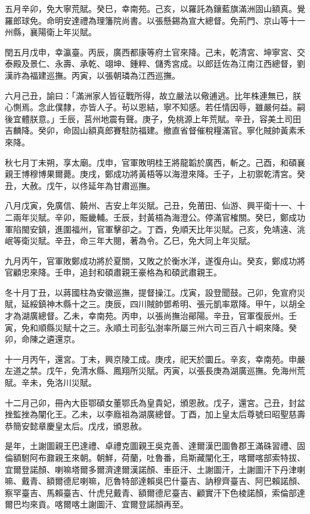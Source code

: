 \begin{pinyinscope}
五月辛卯，免大寧荒賦。癸巳，幸南苑。己亥，以羅託為鑲藍旗滿洲固山額真。覺羅郎球免。命明安達禮為理籓院尚書。以張懸錫為宣大總督。免荊門、京山等十一州縣，襄陽衛上年災賦。

閏五月戊申，幸瀛臺。丙辰，廣西都康等府土官來降。己未，乾清宮、坤寧宮、交泰殿及景仁、永壽、承乾、翊坤、鍾粹、儲秀宮成。以郎廷佐為江南江西總督，劉漢祚為福建巡撫。丙寅，以張朝璘為江西巡撫。

六月己丑，諭曰：「滿洲家人皆征戰所得，故立嚴法以儆逋逃。比年株連無已，朕心惻焉。念此僕隸，亦皆人子。茍以恩結，寧不知感。若任情因辱，雖嚴何益。嗣後宜體朕意。」壬辰，莒州地震有聲。庚子，免桃源上年荒賦。辛丑，容美土司田吉麟降。癸卯，命固山額真郎賽駐防福建。撤直省督催稅糧滿官。寧化賊帥黃素禾來降。

秋七月丁未朔，享太廟。戊申，官軍敗明桂王將龍韜於廣西，斬之。己酉，和碩襄親王博穆博果爾薨。庚戌，鄭成功將黃梧等以海澄來降。壬子，上初禦乾清宮。癸丑，大赦。戊午，以佟延年為甘肅巡撫。

八月戊寅，免廣信、饒州、吉安上年災賦。己丑，免莆田、仙游、興平衛十一、十二兩年災賦。辛卯，賑畿輔。壬辰，封黃梧為海澄公。停滿官榷關。癸巳，鄭成功軍陷閩安鎮，進圍福州，官軍擊卻之。丁酉，免順天比年災賦。己亥，免靖遠、洮岷等衛災賦。辛丑，命三年大閱，著為令。乙巳，免大同上年災賦。

九月丙午，官軍敗鄭成功將於夏關，又敗之於衡水洋，遂復舟山。癸亥，鄭成功將官顧忠來降。壬申，追封和碩肅親王豪格為和碩武肅親王。

冬十月丁丑，以蔣國柱為安徽巡撫，提督操江。戊寅，設登聞鼓。己卯，免宣府災賦，延綏鎮神木縣十之三。庚辰，四川賊帥鄧希明、張元凱率眾降。甲午，以胡全才為湖廣總督。乙未，幸南苑。丙申，以張尚撫治鄖陽。辛丑，官軍復辰州。壬寅，免和順縣災賦十之三。永順土司彭弘澍率所屬三州六司三百八十峒來降。癸卯，命陳之遴還京。

十一月丙午，還宮。丁未，興京陵工成。庚戌，祀天於圜丘。辛亥，幸南苑。申嚴左道之禁。戊午，免清水縣、鳳翔所災賦。丙寅，以張長庚為湖廣巡撫。免海州荒賦。辛未，免洛川災賦。

十二月己卯，冊內大臣鄂碩女董鄂氏為皇貴妃，頒恩赦。戊子，還宮。己丑，封盆挫監挫為闡化王。乙未，以李廕祖為湖廣總督。丁酉，加上皇太后尊號曰昭聖慈壽恭簡安懿章慶皇太后。戊戌，頒恩赦。

是年，土謝圖親王巴達禮、卓禮克圖親王吳克善、達爾漢巴圖魯郡王滿硃習禮、固倫額駙阿布鼐親王來朝。朝鮮，荷蘭，吐魯番，烏斯藏闡化王，喀爾喀部索特拔、宜爾登諾顏、喇嘛塔爾多爾濟達爾漢諾顏、車臣汗、土謝圖汗，土謝圖汗下丹津喇嘛、戴青、額爾德尼喇嘛，厄魯特部達賴吳巴什臺吉、訥穆齊臺吉、阿巴賴諾顏、察罕臺吉、馬賴臺吉、什虎兒戴青、額爾德尼臺吉、顧實汗下色棱諾顏，索倫部達爾巴均來貢。喀爾喀土謝圖汗、宜爾登諾顏再至。


\end{pinyinscope}
